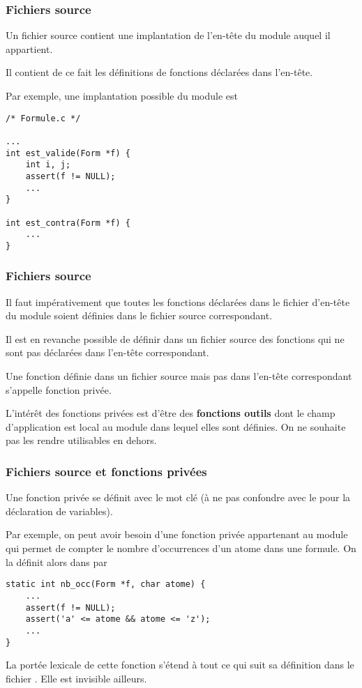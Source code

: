\begin{frame}[fragile]
\frametitle{Fichiers source}
Un fichier source contient une \alert{implantation} de l'en-tête du
module auquel il appartient.
\medskip

Il contient de ce fait les définitions de fonctions déclarées dans
l'en-tête.
\medskip

Par exemple, une implantation possible du module  est
\medskip

\begin{minipage}[c]{.4\textwidth}
\begin{lstlisting}[frame=single,numbers=none]
/* Formule.c */

...
int est_valide(Form *f) {
    int i, j;
    assert(f != NULL);
    ...
}

int est_contra(Form *f) {
    ...
}
\end{lstlisting}
\end{minipage}
\end{frame}

\begin{frame}[fragile]
\frametitle{Fichiers source}
Il faut impérativement que toutes les fonctions déclarées dans le fichier
d'en-tête du module soient \alert{définies} dans le fichier source
correspondant.
\bigskip
\bigskip

Il est en revanche possible de définir dans un fichier source des fonctions
qui ne sont pas déclarées dans l'en-tête correspondant.
\bigskip
\bigskip

Une fonction définie dans un fichier source mais pas dans l'en-tête
correspondant s'appelle \alert{fonction privée}.
\bigskip
\bigskip

L'intérêt des fonctions privées est d'être des {\bf fonctions outils}
dont le champ d'application est local au module dans lequel elles sont
définies. On ne souhaite pas les rendre utilisables en dehors.
\end{frame}

\begin{frame}[fragile]
\frametitle{Fichiers source et fonctions privées}
Une fonction privée se définit avec le mot clé  (à ne pas
confondre avec le  pour la déclaration de variables).
\bigskip

Par exemple, on peut avoir besoin d'une fonction privée appartenant au
module  qui permet de compter le nombre d'occurrences d'un
atome dans une formule. On la définit alors dans  par
\begin{lstlisting}
static int nb_occ(Form *f, char atome) {
    ...
    assert(f != NULL);
    assert('a' <= atome && atome <= 'z');
    ...
}
\end{lstlisting}

La portée lexicale de cette fonction s'étend à tout ce qui suit
sa définition dans le fichier . Elle est invisible
ailleurs.
\end{frame}

